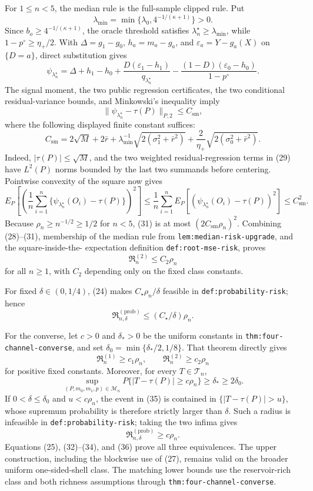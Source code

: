 For \(1\leq n<5\), the median rule is the full-sample clipped rule.  Put
\[
\lambda_{\min}=\min\{\lambda_0,4^{-1/(\kappa+1)}\}>0.
\]
Since \(b_o\geq4^{-1/(\kappa+1)}\), the oracle threshold satisfies
\(\lambda_n^\star\geq\lambda_{\min}\), while
\(1-p^\circ\geq\eta_+/2\).  With
\(\Delta=g_1-g_0\), \(h_a=m_a-g_a\), and
\(\varepsilon_a=Y-g_a(X)\) on \(\{D=a\}\), direct substitution gives
\[
\psi_{\lambda_n^\star}
=\Delta+h_1-h_0
+\frac{D(\varepsilon_1-h_1)}{q_{\lambda_n^\star}}
-\frac{(1-D)(\varepsilon_0-h_0)}{1-p^\circ}.                       \tag{29}
\]
The signal moment, the two public regression certificates, the two conditional
residual-variance bounds, and Minkowski's inequality imply
\[
\|\psi_{\lambda_n^\star}-\tau(P)\|_{P,2}\leq C_{\mathrm{sm}},      \tag{30}
\]
where the following displayed finite constant suffices:
\[
C_{\mathrm{sm}}
=2\sqrt M+2\bar r
+\lambda_{\min}^{-1}\sqrt{2(\sigma_1^2+\bar r^2)}
+\frac2{\eta_+}\sqrt{2(\sigma_0^2+\bar r^2)}.
\]
Indeed, \(|\tau(P)|\leq\sqrt M\), and the two weighted residual-regression
terms in (29) have \(L^2(P)\) norms bounded by the last two summands before
centering.  Pointwise convexity of the square now gives
\[
E_P\!\left[\left(\frac1n\sum_{i=1}^n
\{\psi_{\lambda_n^\star}(O_i)-\tau(P)\}\right)^2\right]
\leq\frac1n\sum_{i=1}^n
E_P[(\psi_{\lambda_n^\star}(O_i)-\tau(P))^2]
\leq C_{\mathrm{sm}}^2.                                           \tag{31}
\]
Because \(\rho_n\geq n^{-1/2}\geq1/2\) for \(n<5\), (31) is at most
\((2C_{\mathrm{sm}}\rho_n)^2\).  Combining (28)--(31), membership of the
median rule from \texttt{lem:median-risk-upgrade}, and the square-inside-the-
expectation definition \texttt{def:root-mse-risk}, proves
\[
\mathfrak R_n^{(2)}\leq C_2\rho_n                                  \tag{32}
\]
for all \(n\geq1\), with \(C_2\) depending only on the fixed class constants.

For fixed \(\delta\in(0,1/4)\), (24) makes
\(C_\star\rho_n/\delta\) feasible in
\texttt{def:probability-risk}; hence
\[
\mathfrak R_{n,\delta}^{(\mathrm{prob})}
\leq(C_\star/\delta)\rho_n.                                       \tag{33}
\]

For the converse, let \(c>0\) and \(\delta_*>0\) be the uniform constants in
\texttt{thm:four-channel-converse}, and set
\(\delta_0=\min\{\delta_*/2,1/8\}\).  That theorem directly gives
\[
\mathfrak R_n^{(1)}\geq c_1\rho_n,
\qquad
\mathfrak R_n^{(2)}\geq c_2\rho_n                                 \tag{34}
\]
for positive fixed constants.  Moreover, for every \(T\in\mathcal T_n\),
\[
\sup_{(P,m_0,m_1,p)\in\mathcal M_n}
P\{|T-\tau(P)|\geq c\rho_n\}
\geq\delta_*\geq2\delta_0.                                       \tag{35}
\]
If \(0<\delta\leq\delta_0\) and \(u<c\rho_n\), the event in (35) is
contained in \(\{|T-\tau(P)|>u\}\), whose supremum probability is therefore
strictly larger than \(\delta\).  Such a radius is infeasible in
\texttt{def:probability-risk}; taking the two infima gives
\[
\mathfrak R_{n,\delta}^{(\mathrm{prob})}\geq c\rho_n.               \tag{36}
\]
Equations (25), (32)--(34), and (36) prove all three equivalences.  The upper
construction, including the blockwise use of (27), remains valid on the
broader uniform one-sided-shell class.  The matching lower bounds use the
reservoir-rich class and both richness assumptions through
\texttt{thm:four-channel-converse}.
